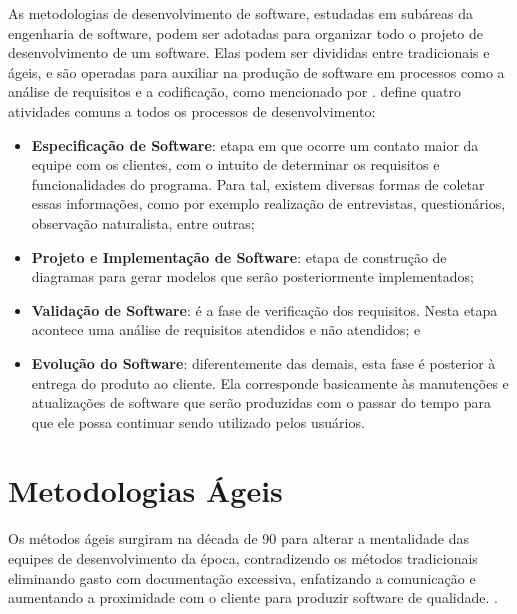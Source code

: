 As metodologias de desenvolvimento de software, estudadas em subáreas da engenharia de software, podem ser adotadas para organizar todo o projeto de desenvolvimento de um software. Elas podem ser divididas entre tradicionais e ágeis, e são operadas para auxiliar na produção de software em processos como a análise de requisitos e a codificação, como mencionado por .  define quatro atividades comuns a todos os processos de desenvolvimento:

\begin{itemize}
 \item \textbf{Especificação de Software}: etapa em que ocorre um contato maior da equipe com os clientes, com o intuito de determinar os requisitos e funcionalidades do programa. Para tal, existem diversas formas de coletar essas informações, como por exemplo realização de entrevistas, questionários, observação naturalista, entre outras;
 \item \textbf{Projeto e Implementação de Software}: etapa de construção de diagramas para gerar modelos que serão posteriormente implementados;
 \item \textbf{Validação de Software}: é a fase de verificação dos requisitos. Nesta etapa acontece uma análise de requisitos atendidos e não atendidos; e
 \item \textbf{Evolução do Software}: diferentemente das demais, esta fase é posterior à entrega do produto ao cliente. Ela corresponde basicamente às manutenções e atualizações de software que serão produzidas com o passar do tempo para que ele possa continuar sendo utilizado pelos usuários.
\end{itemize}

\hspace{2.5cm}

\section{Metodologias Ágeis}
\label{sec:metodologiaagil}
\hspace{2.5cm}

Os métodos ágeis surgiram na década de 90 para alterar a mentalidade das equipes de desenvolvimento da época, contradizendo os métodos tradicionais eliminando gasto com documentação excessiva, enfatizando a comunicação e aumentando a proximidade com o cliente para produzir software de qualidade. .

